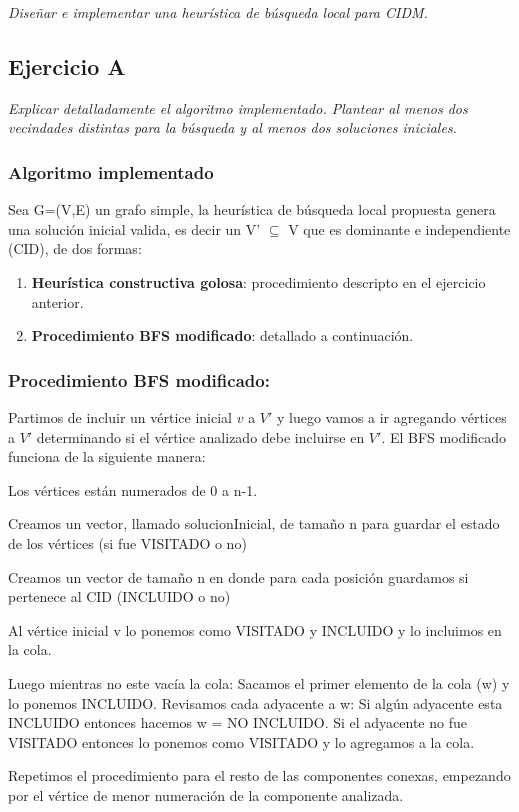 \textit{Diseñar e implementar una heurística de búsqueda local para CIDM.}

\subsection{Ejercicio A}

\textit{Explicar detalladamente el algoritmo implementado. Plantear al menos dos vecindades distintas para la búsqueda y al menos dos soluciones iniciales.}

\medskip

\subsubsection{Algoritmo implementado}

Sea G=(V,E) un grafo simple, la heurística de búsqueda local propuesta genera una solución inicial valida, es decir un V' $\subseteq$ V que es dominante e independiente (CID), de dos formas:
\begin{enumerate}
	\item \textbf{Heurística constructiva golosa}: procedimiento descripto en el ejercicio anterior.
    \item \textbf{Procedimiento BFS modificado}: detallado a continuación.

\end{enumerate}

\subsubsection{Procedimiento BFS modificado:}

Partimos de incluir un vértice inicial $v$ a $V'$ y luego vamos a ir agregando vértices a $V'$ determinando si el vértice analizado debe incluirse en $V'$.
El BFS modificado funciona de la siguiente manera:
\medskip

\begin{codesnippet}
Los vértices están numerados de 0 a n-1.

Creamos un vector, llamado solucionInicial, de tamaño n para guardar el estado de los
vértices (si fue VISITADO o no)

Creamos un vector de tamaño n en donde para cada posición guardamos si
pertenece al CID (INCLUIDO o no)

Al vértice inicial v lo ponemos como VISITADO y INCLUIDO y lo incluimos en la cola.

Luego mientras no este vacía la cola:
    Sacamos el primer elemento de la cola (w) y lo ponemos INCLUIDO.
    Revisamos cada adyacente a w:
        Si algún adyacente esta INCLUIDO entonces hacemos w = NO INCLUIDO.
        Si el adyacente no fue VISITADO entonces lo ponemos como VISITADO y
        lo agregamos a la cola.

Repetimos el procedimiento para el resto de las componentes conexas, empezando por
el vértice de menor numeración de la componente analizada.
\end{codesnippet}

